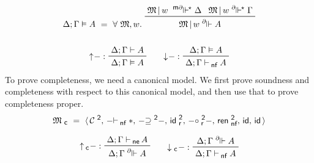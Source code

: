 \documentclass{entcs}
\newcommand{\id}{\operatorname{\tsf{id}}}
\renewcommand{\:}{\mathrel{:}}
\renewcommand{\;}{\mathbin{;}}
\newcommand{\postop}[1]{-\mathord{#1}}
\newcommand{\binop}[1]{-\mathord{#1}-}
\let\oldforall\forall
\renewcommand{\forall}{\oldforall\,}
\newcommand{\tsf}[1]{\textsf{\upshape{#1}}}
\newcommand{\stsf}[1]{\tsf{\small{#1}}}
\newcommand{\tyrule}[1]{\prftree[l]{${#1} \:\,$}}
\newcommand{\CZ}{\mathcal{C}^{\stsf{2}}}
\renewcommand{\e}{\mathrel{\vdash}}
\newcommand{\enf}{\mathrel{\vdash_{\mkern-2mu\stsf{nf}}}}
\newcommand{\ene}{\mathrel{\vdash_{\mkern-2mu\rlap{$\stsf{ne}$}\hphantom{\stsf{nf}}}}}
\newcommand{\geqZ}{\mathrel{\supseteq^{\stsf{2}}}}
\newcommand{\idrZ}{\operatorname{\tsf{id}_{\stsf{r}}^{\stsf{2}}}}
\newcommand{\comprZ}{\mathrel{\circ_{\mkern-1mu\stsf{r}}^{\stsf{2}}}}
\newcommand{\rennfZ}{\operatorname{\tsf{ren}_{\stsf{nf}}^{\stsf{2}}}}
\newcommand{\M}{\mathfrak{M}}
\newcommand{\Mc}{\mathfrak{M}_{\stsf{c}}}
\newcommand{\dee}{\mathrel{^{\partial\mkern-7mu}\Vdash}}
\newcommand{\dees}{\mathrel{^{\partial\mkern-7mu}\Vdash^{\mkern-2mu\star}}}
\newcommand{\mdees}{\mathrel{^{\stsf{m}\partial\mkern-7mu}\Vdash^{\mkern-2mu\star}}}
\newcommand{\eeq}{\mathrel{\vDash}}
\newcommand{\reflect}{\uparrow\mkern-4mu}
\newcommand{\reifyc}{\downarrow_{\stsf{c}}\mkern-4mu}
\newcommand{\reflectc}{\uparrow_{\mkern-2mu\stsf{c}}\mkern-4mu}
\newcommand{\reify}{\downarrow\mkern-4mu}
\newcommand{\eval}{\operatorname{\tsf{eval}}}
\begin{document}
\begin{gather*}
  \Delta; \Gamma \eeq A\ =\ \forall \M, w.\ \prftree{\M\,|\,w \mdees \Delta}{\M\,|\,w \dees \Gamma}{\M\,|\,w \dee A}\\[\baselineskip]
  \tyrule{\reflect{-}}{\Delta; \Gamma \e A}{\Delta; \Gamma \eeq A}
  \qquad
  \tyrule{\reify{-}}{\Delta; \Gamma \eeq A}{\Delta; \Gamma \enf A}
\end{gather*}
To prove completeness, we need a canonical model.  We first prove soundness and completeness with respect to this canonical model, and then use that to prove completeness proper.
\begin{gather*}
  \Mc\ =\ \langle\,\CZ,\,\postop{\enf \ast},\,\binop{\geqZ},\,\idrZ,\,\binop{\comprZ},\,\rennfZ,\,\id,\,\id\,\rangle\\[0.5\baselineskip]
  \tyrule{\reflectc{-}}{\Delta; \Gamma \ene A}{\Delta; \Gamma \dee A}
  \qquad
  \tyrule{\reifyc{-}}{\Delta; \Gamma \dee A}{\Delta; \Gamma \enf A}
\end{gather*}
%
%
\end{document}

